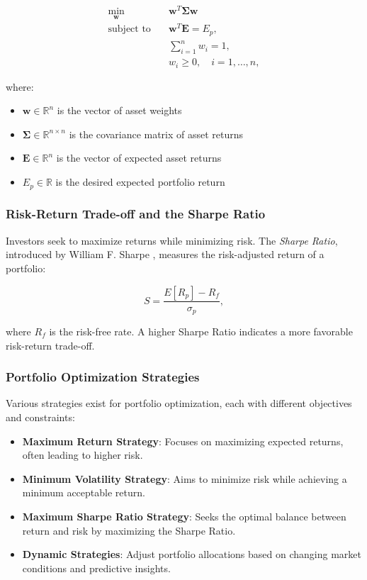 \begin{equation}
\begin{aligned}
    \min_{\mathbf{w}} \quad & \mathbf{w}^T \boldsymbol{\Sigma} \mathbf{w} \\[1ex]
    \text{subject to} \quad & \mathbf{w}^T \mathbf{E} = E_p, \\[1ex]
    & \sum_{i=1}^{n} w_i = 1, \\[1ex]
    & w_i \geq 0, \quad i = 1,\ldots,n,
\end{aligned}
\end{equation}

where:
\begin{itemize}
    \item $\mathbf{w} \in \mathbb{R}^n$ is the vector of asset weights
    \item $\boldsymbol{\Sigma} \in \mathbb{R}^{n \times n}$ is the covariance matrix of asset returns
    \item $\mathbf{E} \in \mathbb{R}^n$ is the vector of expected asset returns
    \item $E_p \in \mathbb{R}$ is the desired expected portfolio return
\end{itemize}
\subsubsection{Risk-Return Trade-off and the Sharpe Ratio}

Investors seek to maximize returns while minimizing risk. The \textit{Sharpe Ratio}, introduced by William F. Sharpe \cite{sharpe1966mutual}, measures the risk-adjusted return of a portfolio:

\begin{equation}
    S = \frac{E[R_p] - R_f}{\sigma_p},
\end{equation}

where $R_f$ is the risk-free rate. A higher Sharpe Ratio indicates a more favorable risk-return trade-off.

\subsubsection{Portfolio Optimization Strategies}

Various strategies exist for portfolio optimization, each with different objectives and constraints:

\begin{itemize}
    \item \textbf{Maximum Return Strategy}: Focuses on maximizing expected returns, often leading to higher risk.
    \item \textbf{Minimum Volatility Strategy}: Aims to minimize risk while achieving a minimum acceptable return.
    \item \textbf{Maximum Sharpe Ratio Strategy}: Seeks the optimal balance between return and risk by maximizing the Sharpe Ratio.
    \item \textbf{Dynamic Strategies}: Adjust portfolio allocations based on changing market conditions and predictive insights.
\end{itemize}

